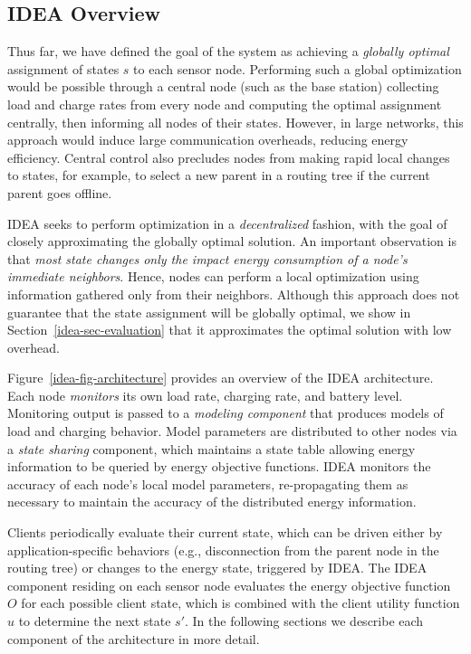\subsection{IDEA Overview}

Thus far, we have defined the goal of the system as achieving a
\textit{globally optimal} assignment of states $s$ to each sensor node.
Performing such a global optimization would be possible through a central
node (such as the base station) collecting load and charge rates from every
node and computing the optimal assignment centrally, then informing all nodes
of their states. However, in large networks, this approach would induce
large communication overheads, reducing energy efficiency. Central control
also precludes nodes from making rapid local changes to states, for example,
to select a new parent in a routing tree if the current parent goes offline.

IDEA seeks to perform optimization in a \textit{decentralized} fashion, with
the goal of closely approximating the globally optimal solution. An important
observation is that \textit{most state changes only the impact energy
consumption of a node's immediate neighbors}. Hence, nodes can perform a
local optimization using information gathered only from their neighbors.
Although this approach does not guarantee that the state assignment will be
globally optimal, we show in Section~\ref{idea-sec-evaluation} that it
approximates the optimal solution with low overhead.

Figure~\ref{idea-fig-architecture} provides an overview of the IDEA
architecture. Each node \textit{monitors} its own load rate, charging rate,
and battery level. Monitoring output is passed to a \textit{modeling
component} that produces models of load and charging behavior. Model
parameters are distributed to other nodes via a \textit{state sharing}
component, which maintains a state table allowing energy information to be
queried by energy objective functions. IDEA monitors the accuracy of each
node's local model parameters, re-propagating them as necessary to maintain
the accuracy of the distributed energy information.

Clients periodically evaluate their current state, which can be driven either
by application-specific behaviors (e.g., disconnection from the parent node
in the routing tree) or changes to the energy state, triggered by IDEA. The
IDEA component residing on each sensor node evaluates the energy objective
function $O$ for each possible client state, which is combined with the
client utility function $u$ to determine the next state $s'$. In the
following sections we describe each component of the architecture in more
detail.

